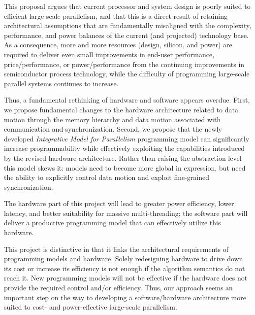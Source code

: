 
This proposal argues that current processor and system design is poorly suited to
efficient large-scale parallelism, and that this is a direct result of retaining architectural assumptions 
that are fundamentally misaligned with the complexity, performance, and power balances of the current 
(and projected) technology base.   As a consequence, more and more resources (design, silicon, and 
power) are required to deliver even small improvements in end-user performance, price/performance, or 
power/performance from the continuing improvements in semiconductor process technology, while the 
difficulty of programming large-scale parallel systems continues to increase.


Thus, a fundamental rethinking of hardware and software appears overdue.   First, we propose
fundamental changes to the hardware architecture related to data motion through the memory
hierarchy and data motion associated with communication and synchronization. 
Second, we propose that the newly developed \textit{Integrative Model for Parallelism} programming 
model can significantly increase programmability while effectively exploiting the capabilities introduced 
by the revised hardware architecture.
Rather than raising the abstraction level this model skews it:
models need to become more global in expression, but need the ability to explicitly control data motion 
and exploit fine-grained synchronization.

The hardware part of this project will lead to greater power efficiency, lower latency,
and  better suitability for massive multi-threading; the software part will 
deliver a productive programming model that can effectively utilize this hardware.

%
This project is distinctive in that it links the architectural requirements of programming models and hardware.
Solely redesigning hardware to drive down its cost or increase its efficiency is not enough
if the algorithm semantics do not reach it.  New programming models will not be effective
if the hardware does not provide the required control and/or efficiency.
Thus, our approach seems an important step on the way to developing a software/hardware
architecture more suited to cost- and power-effective large-scale parallelism.

